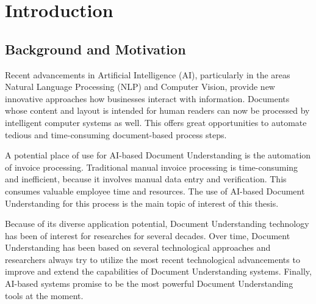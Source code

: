 \chapter{Introduction}

\section{Background and Motivation}

Recent advancements in Artificial Intelligence (AI), particularly in the areas Natural Language Processing (NLP) and Computer Vision, provide new innovative approaches how businesses interact with information. Documents whose content and layout is intended for human readers can now be processed by intelligent computer systems as well. This offers great opportunities to automate tedious and time-consuming document-based process steps.

A potential place of use for AI-based Document Understanding is the automation of invoice processing.
Traditional manual invoice processing is time-consuming and inefficient, because it involves manual data entry and verification. This consumes valuable employee time and resources. The use of AI-based Document Understanding for this process is the main topic of interest of this thesis.

Because of its diverse application potential, Document Understanding technology has been of interest for researches for several decades. Over time, Document Understanding has been based on several technological approaches and researchers always try to utilize the most recent technological advancements to improve and extend the capabilities of Document Understanding systems. Finally, AI-based systems promise to be the most powerful Document Understanding tools at the moment.


